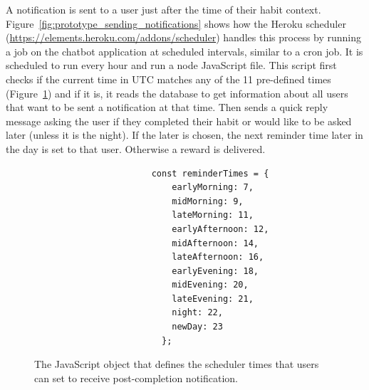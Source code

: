 A notification is sent to a user just after the time of their habit context. Figure~\ref{fig:prototype_sending_notifications} shows how the Heroku scheduler (\url{https://elements.heroku.com/addons/scheduler}) handles this process by running a job on the chatbot application at scheduled intervals, similar to a cron job. It is scheduled to run every hour and run a node JavaScript file. This script first checks if the current time in UTC matches any of the 11 pre-defined times (Figure~\ref{fig:reminder_times}) and if it is, it reads the database to get information about all users that want to be sent a notification at that time. Then sends a quick reply message asking the user if they completed their habit or would like to be asked later (unless it is the night). If the later is chosen, the next reminder time later in the day is set to that user. Otherwise a reward is delivered.

\begin{figure}[H]
  \centering
\begin{lstlisting}
                       const reminderTimes = {
                           earlyMorning: 7,
                           midMorning: 9,
                           lateMorning: 11,
                           earlyAfternoon: 12,
                           midAfternoon: 14,
                           lateAfternoon: 16,
                           earlyEvening: 18,
                           midEvening: 20,
                           lateEvening: 21,
                           night: 22,
                           newDay: 23
                         };
\end{lstlisting}

  \caption{The JavaScript object that defines the scheduler times that users can set to receive post-completion notification.}
  \label{fig:reminder_times}
\end{figure}

